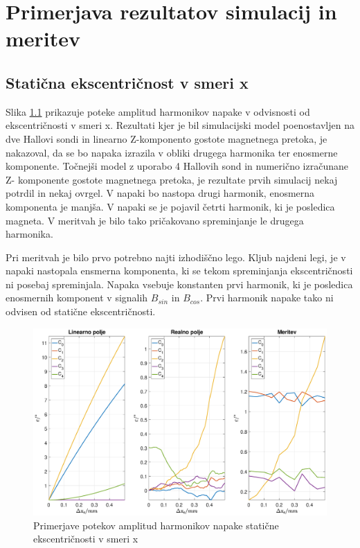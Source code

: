 \chapter{Primerjava rezultatov simulacij in meritev}
\section{Statična ekscentričnost v smeri x}
Slika \ref{primerjava_xs} prikazuje poteke amplitud harmonikov napake v odvisnosti od ekscentričnosti v smeri x. 
Rezultati kjer je bil simulacijski model poenostavljen na dve Hallovi sondi in linearno Z-komponento gostote magnetnega pretoka, je nakazoval, da se bo napaka izrazila v obliki drugega harmonika ter enosmerne komponente.
Točnejši model z uporabo 4 Hallovih sond in numerično izračunane Z- komponente gostote magnetnega pretoka, je rezultate prvih simulacij nekaj potrdil in nekaj ovrgel. V napaki bo nastopa drugi harmonik, enosmerna komponenta je manjša. V napaki se je pojavil četrti harmonik, ki je posledica magneta. V meritvah je bilo tako pričakovano spreminjanje le drugega harmonika.

Pri meritvah je bilo prvo potrebno najti izhodiščno  lego. Kljub najdeni legi, je v napaki nastopala ensmerna komponenta, ki se tekom spreminjanja ekscentričnosti ni posebaj spreminjala. Napaka vsebuje konstanten prvi harmonik, ki je posledica enosmernih komponent v signalih $B_{sin}$ in $B_{cos}$. Prvi harmonik napake tako ni odvisen od statične ekscentričnosti.
\begin{figure}[ht]
	\centering
	\includegraphics[width=\columnwidth]{./Slike/primerjava_xs.eps}
	\caption{Primerjave potekov amplitud harmonikov napake  statične ekscentričnosti v smeri x}
	\label{primerjava_xs}
\end{figure}
